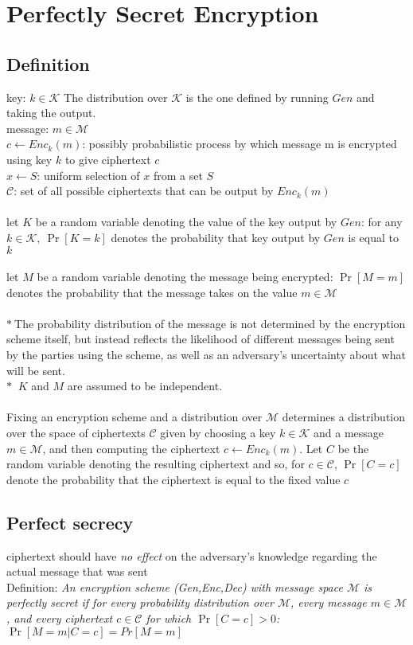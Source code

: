 \section{Perfectly Secret Encryption}

\subsection*{Definition}
key: $k \in \mathcal{K}$ The distribution over $\mathcal{K}$ is 
the one defined by running $Gen$ and taking the output.\\
message: $m \in \mathcal{M}$\\
$c\leftarrow Enc_k(m)$: 
possibly probabilistic process by which 
message m is encrypted using key $k$ to give ciphertext $c$\\
$x \leftarrow S$: uniform selection of $x$ from a set $S$\\
$\mathcal{C}$: set of all possible ciphertexts 
that can be output by $Enc_k(m)$\\\\
let $K$ be a random variable denoting the value of the key output by $Gen$:
for any $k \in \mathcal{K},\ \Pr[K=k]$ denotes the probability that key output
by $Gen$ is equal to $k$\\\\
let $M$ be a random variable denoting the message being encrypted:
$\Pr[M=m]$ denotes the probability that the message takes on the value
$m \in \mathcal{M}$\\\\
$\ast\ $The probability distribution of the message is not 
determined by the encryption scheme itself, but instead reflects the likelihood
 of different messages being sent by the parties using the scheme, as well as an
 adversary’s uncertainty about what will be sent.\\
 $\ast\ $ $K$ and $M$ are assumed to be independent.\\\\
 Fixing an encryption scheme and a distribution over $\mathcal{M}$ determines a
 distribution over the space of ciphertexts $\mathcal{C}$ given by choosing
  a key $k \in \mathcal{K}$ and a message $m \in \mathcal{M}$, and then 
  computing the ciphertext $c \leftarrow Enc_k(m)$. Let $C$ be the random 
  variable denoting the resulting ciphertext and so, for $c \in \mathcal{C}$,
  $\Pr[C=c]$ denote the probability that the ciphertext is equal to the 
  fixed value $c$

\subsection*{Perfect secrecy} 
ciphertext should have \emph{no effect} on the adversary’s 
knowledge regarding the actual message that was sent\\
Definition: \emph{An encryption scheme 
\emph{(Gen,Enc,Dec)} with message space $\mathcal{M}$ is perfectly secret 
if for every probability distribution over $\mathcal{M}$, 
every message $m \in \mathcal{M}$, and every 
ciphertext $c \in \mathcal{C}$ for which $\Pr[C = c] > 0$:}
$\Pr[M=m|C=c]=Pr[M=m]$\\